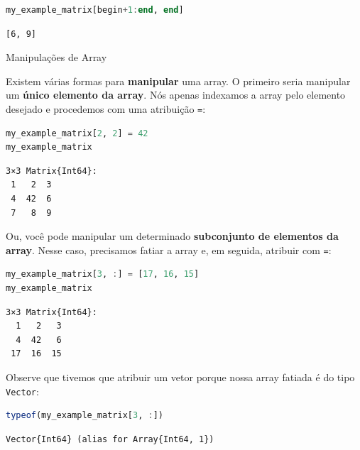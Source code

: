 \documentclass[
  notoc %
]{tufte-book}
\makeatletter
\newcommand{\passthrough}[1]{#1}
\renewcommand\subsubsection{%
\@startsection{subsubsection}{3}{\z@ }{-3.25ex\@plus -1ex \@minus -.2ex}{1.5ex \@plus .2ex}{\normalfont \normalsize \bfseries }
}
\makeatother
\begin{document}
\begin{lstlisting}[language=Julia]
my_example_matrix[begin+1:end, end]
\end{lstlisting}

\begin{lstlisting}[language=Output]
[6, 9]
\end{lstlisting}

\hypertarget{sec:array_manipulation}{%
\subsubsection{Manipulações de Array}\label{sec:array_manipulation}}

Existem várias formas para \textbf{manipular} uma array. O primeiro
seria manipular um \textbf{único elemento da array}. Nós apenas
indexamos a array pelo elemento desejado e procedemos com uma atribuição
\passthrough{\lstinline!=!}:

\begin{lstlisting}[language=Julia]
my_example_matrix[2, 2] = 42
my_example_matrix
\end{lstlisting}

\begin{lstlisting}[language=Output]
3×3 Matrix{Int64}:
 1   2  3
 4  42  6
 7   8  9
\end{lstlisting}

Ou, você pode manipular um determinado \textbf{subconjunto de elementos
da array}. Nesse caso, precisamos fatiar a array e, em seguida, atribuir
com \passthrough{\lstinline!=!}:

\begin{lstlisting}[language=Julia]
my_example_matrix[3, :] = [17, 16, 15]
my_example_matrix
\end{lstlisting}

\begin{lstlisting}[language=Output]
3×3 Matrix{Int64}:
  1   2   3
  4  42   6
 17  16  15
\end{lstlisting}

Observe que tivemos que atribuir um vetor porque nossa array fatiada é
do tipo \passthrough{\lstinline!Vector!}:

\begin{lstlisting}[language=Julia]
typeof(my_example_matrix[3, :])
\end{lstlisting}

\begin{lstlisting}[language=Output]
Vector{Int64} (alias for Array{Int64, 1})
\end{lstlisting}
\end{document}

